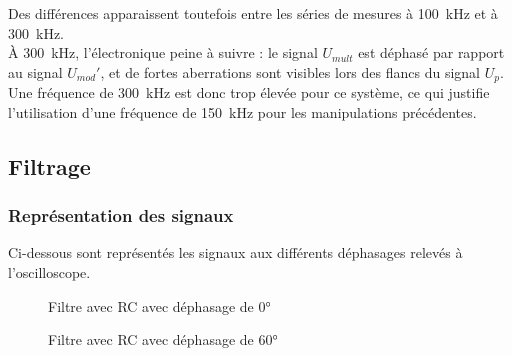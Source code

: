 Des différences apparaissent toutefois entre les séries de mesures à 100~kHz et à 300~kHz. \\  
À 300~kHz, l’électronique peine à suivre : le signal \( U_{mult} \) est déphasé par rapport au signal \( U_{mod}' \),  
et de fortes aberrations sont visibles lors des flancs du signal \( U_{p} \). \\  
Une fréquence de 300~kHz est donc trop élevée pour ce système, ce qui justifie  
l’utilisation d’une fréquence de 150~kHz pour les manipulations précédentes.


\subsection{Filtrage}

\subsubsection{Représentation des signaux}

Ci-dessous sont représentés les signaux aux différents déphasages relevés à l'oscilloscope. 

\begin{figure}[H]
    \begin{minipage}[c]{.50\linewidth}
        \centering
        \caption{Filtre avec RC avec déphasage de 0° }
    \label{fig:f1}
    \end{minipage}
    \hfill%
    \begin{minipage}[c]{.50\linewidth}
        \centering
       \caption{Filtre avec RC avec déphasage de 60°}
 \label{fig:f2}
    \end{minipage}
\end{figure}

